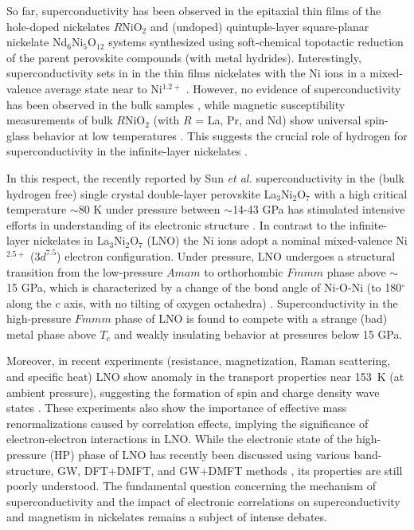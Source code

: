\documentclass[prl,twocolumn,preprintnumbers,superscriptaddress]{revtex4-1}
\begin{document}
So far, superconductivity has been observed in the epitaxial thin films of the hole-doped nickelates $R$NiO$_2$ and (undoped) quintuple-layer square-planar nickelate Nd$_6$Ni$_5$O$_{12}$ systems synthesized 
using soft-chemical topotactic reduction of the parent perovskite compounds (with metal hydrides). Interestingly, superconductivity sets in in the thin films nickelates with the Ni ions in a mixed-valence average state near to Ni$^{1.2+}$ \cite{Li_2019,Hepting_2020,Zeng_2020,Osada_2021,Lu_2021,Goodge_2021,Ren_2021,Wang_2021,Pan_2022,Zeng_2022} . However, no evidence of superconductivity has been observed in the bulk samples \cite{Li_2020,Wang_2020_exp,Huo_2022}, while magnetic susceptibility measurements of bulk $R$NiO$_2$ (with $R$ = La, Pr, and Nd) show universal spin-glass behavior at low temperatures \cite{Lin_2022}. This suggests the 
crucial role of hydrogen for superconductivity in the infinite-layer nickelates \cite{Ding_2023}. 

In this respect, the recently reported by Sun \emph{et al.} superconductivity in the (bulk hydrogen free) single crystal double-layer perovskite La$_3$Ni$_2$O$_7$ with a high critical temperature $\sim$80 K under pressure between $\sim$14-43  GPa \cite{Sun_2023,Liu_2023} has stimulated intensive efforts in understanding of its electronic structure \cite{Luo_2023,Lechermann_2023,Christiansson_2023,Yang_2023,
Zhang_2023,Shen_2023b}. In contrast to the infinite-layer nickelates in 
La$_3$Ni$_2$O$_7$ (LNO) the Ni ions adopt a nominal mixed-valence Ni$^{2.5+}$ ($3d^{7.5}$) electron configuration. Under pressure, LNO undergoes a structural transition from the low-pressure $Amam$ to orthorhombic $Fmmm$ phase above $\sim$15 GPa, which is characterized by a change of the bond angle of Ni-O-Ni (to 180$^\circ$ along the $c$ axis, with no tilting of oxygen octahedra) \cite{Liu_2023,Sun_2023}. Superconductivity in the high-pressure $Fmmm$ phase of LNO is found to compete with 
a strange (bad) metal phase above $T_c$ and weakly insulating behavior at pressures below 15 GPa. 

Moreover, in recent experiments (resistance, magnetization, Raman scattering, and specific heat) LNO show anomaly in the transport properties near 153~K (at ambient pressure), suggesting the formation of spin and charge density wave states \cite{Liu_2023}. These experiments also show the importance of effective mass renormalizations caused by correlation effects, implying the significance of electron-electron interactions in LNO. While the electronic state of the high-pressure (HP) phase of LNO
has recently been discussed using various band-structure, GW, DFT+DMFT, and GW+DMFT methods \cite{Luo_2023,Lechermann_2023,Christiansson_2023,Yang_2023,
Zhang_2023,Shen_2023b}, its properties are still poorly understood.
The fundamental question concerning the mechanism of superconductivity and the impact of electronic correlations on superconductivity and magnetism in nickelates remains a subject of intense debates.
\end{document}
